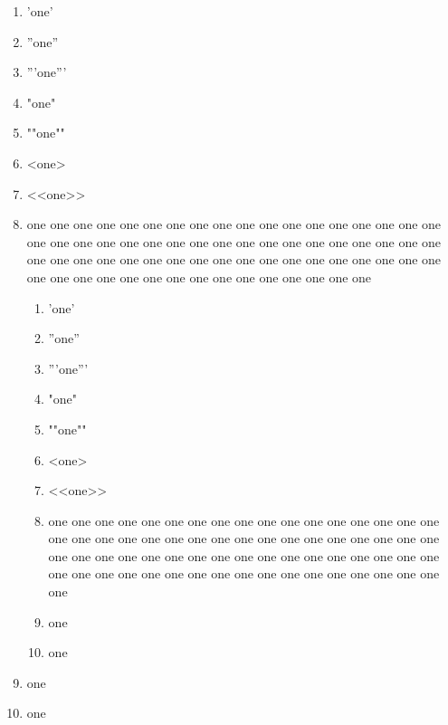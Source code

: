 \lipsum[1]

\begin{enumerate}
\item 'one'
\item ''one''
\item '''one'''
\item "one"
\item ""one""
\item <one>
\item <<one>>
\item one one one one one one one one one one one one one one one one one one one one one one one one one one one one one one one one one one one one one one one one one one one one one one one one one one one one one one one one one one one one one one one one one one one one one

\begin{enumerate}
\item 'one'
\item ''one''
\item '''one'''
\item "one"
\item ""one""
\item <one>
\item <<one>>
\item one one one one one one one one one one one one one one one one one one one one one one one one one one one one one one one one one one one one one one one one one one one one one one one one one one one one one one one one one one one one one one one one one one one one one
\item one
\item one
\end{enumerate}
\item one
\item one
\end{enumerate}


\lipsum[1-10]
